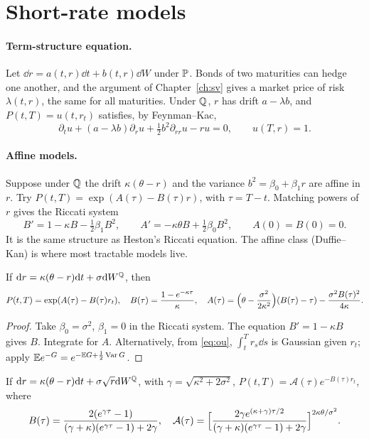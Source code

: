 \section{Short-rate models}

\paragraph{Term-structure equation.} Let $\dd r=a(t,r)\dd t+b(t,r)\dd W$ under $\mathbb{P}$. Bonds of two maturities can hedge one another, and the argument of Chapter~\ref{ch:sv} gives a market price of risk $\lambda(t,r)$, the same for all maturities. Under $\mathbb{Q}$, $r$ has drift $a-\lambda b$, and $P(t,T)=u(t,r_t)$ satisfies, by Feynman--Kac,
\[
\partial_tu+(a-\lambda b)\partial_ru+\tfrac12b^2\partial_{rr}u-ru=0,\qquad u(T,r)=1.
\]

\paragraph{Affine models.} Suppose under $\mathbb{Q}$ the drift $\kappa(\theta-r)$ and the variance $b^2=\beta_0+\beta_1r$ are affine in $r$. Try $P(t,T)=\exp(A(\tau)-B(\tau)r)$, with $\tau=T-t$. Matching powers of $r$ gives the Riccati system
\[
B'=1-\kappa B-\tfrac12\beta_1B^2,\qquad A'=-\kappa\theta B+\tfrac12\beta_0B^2,\qquad A(0)=B(0)=0.
\]
It is the same structure as Heston's Riccati equation. The affine class (Duffie--Kan) is where most tractable models live.

\begin{theorem}[Vasicek]\label{thm:vasicek}
If $\mathrm{d} r=\kappa(\theta-r)\mathrm{d} t+\sigma\mathrm{d} W^{\mathbb{Q}}$, then
\[
P(t,T)=\exp(A(\tau)-B(\tau)r_t),\quad B(\tau)=\frac{1-e^{-\kappa\tau}}{\kappa},\quad A(\tau)=\Bigl(\theta-\frac{\sigma^2}{2\kappa^2}\Bigr)(B(\tau)-\tau)-\frac{\sigma^2B(\tau)^2}{4\kappa}.
\]
\end{theorem}
\begin{proof}
Take $\beta_0=\sigma^2$, $\beta_1=0$ in the Riccati system. The equation $B'=1-\kappa B$ gives $B$. Integrate for $A$. Alternatively, from \eqref{eq:ou}, $\int_t^Tr_s\dd s$ is Gaussian given $r_t$; apply $\mathbb{E} e^{-G}=e^{-\mathbb{E} G+\frac12\operatorname{Var} G}$.
\end{proof}

\begin{theorem}\label{thm:cir}
If $\mathrm{d} r=\kappa(\theta-r)\mathrm{d} t+\sigma\sqrt r\mathrm{d} W^{\mathbb{Q}}$, with $\gamma=\sqrt{\kappa^2+2\sigma^2}$, $P(t,T)=\mathcal{A}(\tau)e^{-B(\tau)r_t}$, where
\[
B(\tau)=\frac{2(e^{\gamma\tau}-1)}{(\gamma+\kappa)(e^{\gamma\tau}-1)+2\gamma},\quad\mathcal{A}(\tau)=\Bigl[\frac{2\gamma e^{(\kappa+\gamma)\tau/2}}{(\gamma+\kappa)(e^{\gamma\tau}-1)+2\gamma}\Bigr]^{2\kappa\theta/\sigma^2}.
\]
\end{theorem}

